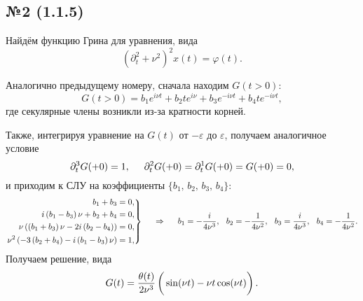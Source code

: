 \subsection*{№2 (1.1.5)}

Найдём функцию Грина для уравнения, вида
\begin{equation*}
    (\partial_t^2 + \nu^2)^2 x (t) = \varphi(t).
\end{equation*}

Аналогично предыдущему номеру, сначала находим $G(t>0)$:
\begin{equation*}
    G(t>0) = b_1 e^{i \nu t} + b_2 t e^{i \nu} + b_3 e^{- i \nu t} + b_4 t e^{- i \nu t},
\end{equation*}
где секулярные члены возникли из-за кратности корней.

Также, интегрируя уравнение на $G(t)$ от $-\varepsilon$ до $\varepsilon$, получаем аналогичное условие
\begin{equation*}
    \partial_t^3 G(+0)  = 1, \hspace{5 mm} \partial_t^2 G(+0) = \partial_t^1 G(+0) = G(+0) = 0,
\end{equation*}
и приходим к СЛУ на коэффициенты $\{b_1,\, b_2,\, b_3,\, b_4\}$:
\begin{equation*}
    \left.\begin{aligned}
        b_1+b_3&=0, \\
        i \left(b_1-b_3\right) \nu +b_2+b_4&=0, \\ 
        \nu  \left(\left(b_1+b_3\right) \nu -2 i \left(b_2-b_4\right)\right)&=0, \\
        \nu ^2 \left(-3 \left(b_2+b_4\right)-i \left(b_1-b_3\right) \nu \right)&=1, \\
    \end{aligned}\right\}
    \hspace{0.5cm} \Rightarrow \hspace{0.5cm}
    b_1 = -\frac{i}{4 \nu ^3}, \hspace{2.5 mm} 
    b_2 = -\frac{1}{4 \nu ^2}, \hspace{2.5 mm} 
    b_3 = \frac{i}{4 \nu ^3}, \hspace{2.5 mm} 
    b_4 = -\frac{1}{4 \nu ^2}.
\end{equation*}
Получаем решение, вида
\begin{equation*}
    G(t) = \frac{\theta(t)}{2 \nu^3} \left( \vp
        \sin(\nu t) - \nu t \cos(\nu t)
    \right).
\end{equation*}




